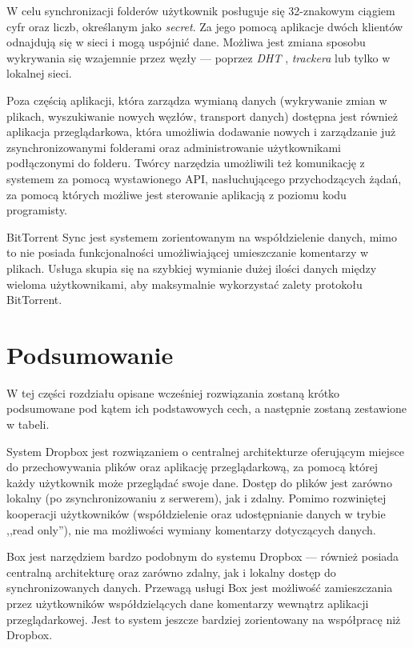 \documentclass[polish,a4paper,twoside]{ppfcmthesis}
\begin{document}
W celu synchronizacji folderów użytkownik posługuje się 32-znakowym ciągiem cyfr oraz liczb, określanym jako \emph{secret}. Za jego pomocą aplikacje dwóch klientów odnajdują się w sieci i mogą uspójnić dane. Możliwa jest zmiana sposobu wykrywania się wzajemnie przez węzły --- poprzez \emph{DHT} \cite{dht} \cite{dhtarticle} \cite{dhtarticle2}, \emph{trackera} lub tylko w lokalnej sieci.

Poza częścią aplikacji, która zarządza wymianą danych (wykrywanie zmian w plikach, wyszukiwanie nowych węzłów, transport danych) dostępna jest również aplikacja przeglądarkowa, która umożliwia dodawanie nowych i zarządzanie już zsynchronizowanymi folderami oraz administrowanie użytkownikami podłączonymi do folderu. Twórcy narzędzia umożliwili też komunikację z systemem za pomocą wystawionego API, nasłuchującego przychodzących żądań, za pomocą których możliwe jest sterowanie aplikacją z poziomu kodu programisty.

BitTorrent Sync jest systemem zorientowanym na współdzielenie danych, mimo to nie posiada funkcjonalności umożliwiającej umieszczanie komentarzy w plikach. Usługa skupia się na szybkiej wymianie dużej ilości danych między wieloma użytkownikami, aby maksymalnie wykorzystać zalety protokołu BitTorrent.

\section*{Podsumowanie}

W tej części rozdziału opisane wcześniej rozwiązania zostaną krótko podsumowane pod kątem ich podstawowych cech, a następnie zostaną zestawione w tabeli.

System Dropbox jest rozwiązaniem o centralnej architekturze oferującym miejsce do przechowywania plików oraz aplikację przeglądarkową, za pomocą której każdy użytkownik może przeglądać swoje dane. Dostęp do plików jest zarówno lokalny (po zsynchronizowaniu z serwerem), jak i zdalny. Pomimo rozwiniętej kooperacji użytkowników (współdzielenie oraz udostępnianie danych w trybie ,,read only''), nie ma możliwości wymiany komentarzy dotyczących danych.

Box jest narzędziem bardzo podobnym do systemu Dropbox --- również posiada centralną architekturę oraz zarówno zdalny, jak i lokalny dostęp do synchronizowanych danych. Przewagą usługi Box jest możliwość zamieszczania przez użytkowników współdzielących dane komentarzy wewnątrz aplikacji przeglądarkowej. Jest to system jeszcze bardziej zorientowany na współpracę niż Dropbox.
\end{document}
